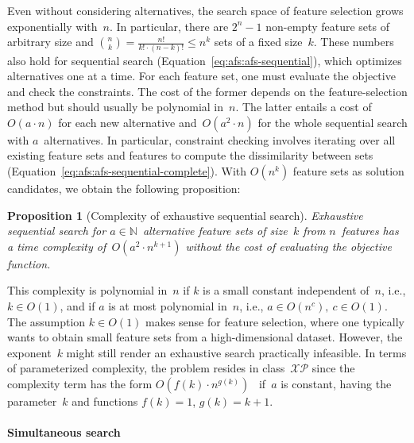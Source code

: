 \documentclass[iicol, sn-basic, Numbered]{sn-jnl} %
\theoremstyle{plain}
\newtheorem{proposition}{Proposition}
\theoremstyle{definition}
\begin{document}
Even without considering alternatives, the search space of feature selection grows exponentially with~$n$.
In particular, there are $2^n - 1$ non-empty feature sets of arbitrary size and $\binom{n}{k} = \frac{n!}{k! \cdot (n-k)!} \leq n^k$ sets of a fixed size~$k$.
These numbers also hold for sequential search (Equation~\ref{eq:afs:afs-sequential}), which optimizes alternatives one at a time.
For each feature set, one must evaluate the objective and check the constraints.
The cost of the former depends on the feature-selection method but should usually be polynomial in~$n$.
The latter entails a cost of~$O(a \cdot n)$ for each new alternative and~$O(a^2 \cdot n)$ for the whole sequential search with $a$~alternatives.
In particular, constraint checking involves iterating over all existing feature sets and features to compute the dissimilarity between sets (Equation~\ref{eq:afs:afs-sequential-complete}).
With $O(n^k)$ feature sets as solution candidates, we obtain the following proposition:
%
\begin{proposition}[Complexity of exhaustive sequential search]
	Exhaustive sequential search for $a \in \mathbb{N}$~alternative feature sets of size~$k$ from $n$~features has a time complexity of~$O(a^2 \cdot n^{k+1})$ without the cost of evaluating the objective function.
	\label{prop:afs:complexity-exhaustive-sequential}
\end{proposition}
%
This complexity is polynomial in~$n$ if $k$ is a small constant independent of~$n$, i.e., $k \in O(1)$, and if $a$ is at most polynomial in~$n$, i.e., $a \in O(n^c),~c \in O(1)$.
The assumption $k \in O(1)$ makes sense for feature selection, where one typically wants to obtain small feature sets from a high-dimensional dataset.
However, the exponent~$k$ might still render an exhaustive search practically infeasible.
In terms of parameterized complexity, the problem resides in class~$\mathcal{XP}$ since the complexity term has the form $O(f(k) \cdot n^{g(k)})$~\cite{downey1997parameterized} if~$a$ is constant, having the parameter~$k$ and functions $f(k) = 1$, $g(k) = k+1$.

\paragraph{Simultaneous search}
\end{document}
